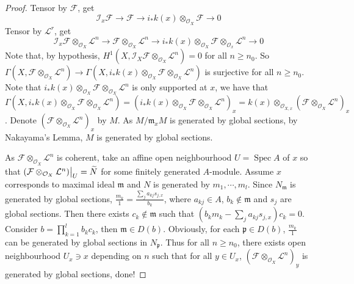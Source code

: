 \documentclass{ctexart}
\newcommand{\spec}{\operatorname{Spec}}
\begin{document}
\begin{proof}
    Tensor by $\mathcal{F}$, get
    \begin{equation}
        \mathcal{I}_{x}\mathcal{F} \longrightarrow \mathcal{F} \longrightarrow i_{\ast}k(x) \otimes_{\mathcal{O}_{X}} \mathcal{F} \longrightarrow 0
    \end{equation}
    Tensor by $\mathcal{L}^{r}$, get
    \begin{equation}
        \mathcal{I}_{x}\mathcal{F} \otimes_{\mathcal{O}_{X}} \mathcal{L}^{n} \longrightarrow \mathcal{F} \otimes_{\mathcal{O}_{X}} \mathcal{L}^{n} \longrightarrow i_{\ast}k(x) \otimes_{\mathcal{O}_{X}} \mathcal{F} \otimes_{\mathcal{O}_{x}} \mathcal{L}^{n}\longrightarrow 0
    \end{equation}
    Note that, by hypothesis, $H^{1}(X, \mathcal{I}_{X}\mathcal{F} \otimes_{\mathcal{O}_{X}} \mathcal{L}^{n}) = 0$ for all $n \ge n_{0}$.
    So $\Gamma(X, \mathcal{F} \otimes_{\mathcal{O}_{X}} \mathcal{L}^{n}) \longrightarrow \Gamma(X, i_{\ast}k(x) \otimes_{\mathcal{O}_{X}} \mathcal{F} \otimes_{\mathcal{O}_{X}} \mathcal{L}^{n})$ is surjective for all $n \ge n_{0}$.
    Note that $i_{\ast}k(x) \otimes_{\mathcal{O}_{X}} \mathcal{F} \otimes_{\mathcal{O}_{X}} \mathcal{L}^{n}$ is only supported at $x$,
    we have that $\Gamma(X, i_{\ast}k(x) \otimes_{\mathcal{O}_{X}} \mathcal{F} \otimes_{\mathcal{O}_{X}} \mathcal{L}^{n}) = (i_{\ast}k(x) \otimes_{\mathcal{O}_{X}} \mathcal{F} \otimes_{\mathcal{O}_{X}} \mathcal{L}^{n})_{x} = k(x) \otimes_{\mathcal{O}_{X, x}} (\mathcal{F} \otimes_{\mathcal{O}_{X}} \mathcal{L}^{n})_{x}$.
    Denote $(\mathcal{F} \otimes_{\mathcal{O}_{X}} \mathcal{L}^{n})_{x}$ by $M$.
    As $M/\mathfrak{m}_{x}M$ is generated by global sections, by Nakayama's Lemma, $M$ is generated by global sections.
    \par
    As $\mathcal{F} \otimes_{\mathcal{O}_{X}} \mathcal{L}^{n}$ is coherent,
    take an affine open neighbourhood $U = \spec A$ of $x$ so that $(\mathcal{F} \otimes_{\mathcal{O}_{X}} \mathcal{L}^{n})\big{|}_{U} = \widetilde{N}$ for some finitely generated $A$-module.
    Assume $x$ corresponds to maximal ideal $\mathfrak{m}$ and $N$ is generated by $m_{1}, \cdots, m_{l}$.
    Since $N_{\mathfrak{m}}$ is generated by global sections, $\frac{m_{k}}{1} = \frac{\sum_{j} a_{kj}s_{j, x}}{b_{k}}$,
    where $a_{kj}\in A$, $b_{k}\notin \mathfrak{m}$ and $s_{j}$ are global sections.
    Then there exists $c_{k}\notin \mathfrak{m}$ such that $(b_{k}m_{k} - \sum_{j} a_{kj}s_{j, x})c_{k} = 0$.
    Consider $b = \prod_{k = 1}^{l} b_{k}c_{k}$, then $\mathfrak{m}\in D(b)$.
    Obviously, for each $\mathfrak{p}\in D(b)$, $\frac{m_{k}}{1}$ can be generated by global sections in $N_{\mathfrak{p}}$.
    Thus for all $n \ge n_{0}$, there exists open neighbourhood $U_{x}\ni x$ depending on $n$ such that for all $y\in U_{x}$,
    $(\mathcal{F} \otimes_{\mathcal{O}_{X}} \mathcal{L}^{n})_{y}$ is generated by global sections, done!
\end{proof}
\end{document}
